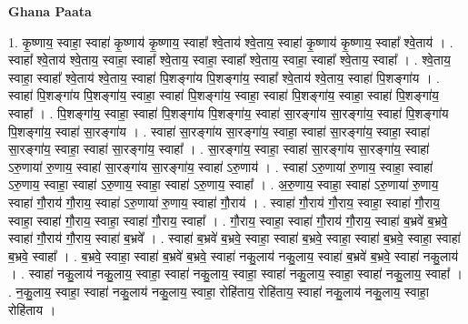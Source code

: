 \documentclass[17pt]{extarticle}
\begin{document}
\textbf{Ghana Paata } \newline

1. कृ॒ष्णाय॒ स्वाहा॒ स्वाहा॑ कृ॒ष्णाय॑ कृ॒ष्णाय॒ स्वाहा᳚ श्वे॒ताय॑ श्वे॒ताय॒ स्वाहा॑ कृ॒ष्णाय॑ कृ॒ष्णाय॒ स्वाहा᳚ श्वे॒ताय॑ । . स्वाहा᳚ श्वे॒ताय॑ श्वे॒ताय॒ स्वाहा॒ स्वाहा᳚ श्वे॒ताय॒ स्वाहा॒ स्वाहा᳚ श्वे॒ताय॒ स्वाहा॒ स्वाहा᳚ श्वे॒ताय॒ स्वाहा᳚ । . श्वे॒ताय॒ स्वाहा॒ स्वाहा᳚ श्वे॒ताय॑ श्वे॒ताय॒ स्वाहा॑ पि॒शङ्गा॑य पि॒शङ्गा॑य॒ स्वाहा᳚ श्वे॒ताय॑ श्वे॒ताय॒ स्वाहा॑ पि॒शङ्गा॑य । . स्वाहा॑ पि॒शङ्गा॑य पि॒शङ्गा॑य॒ स्वाहा॒ स्वाहा॑ पि॒शङ्गा॑य॒ स्वाहा॒ स्वाहा॑ पि॒शङ्गा॑य॒ स्वाहा॒ स्वाहा॑ पि॒शङ्गा॑य॒ स्वाहा᳚ । . पि॒शङ्गा॑य॒ स्वाहा॒ स्वाहा॑ पि॒शङ्गा॑य पि॒शङ्गा॑य॒ स्वाहा॑ सा॒रङ्गा॑य सा॒रङ्गा॑य॒ स्वाहा॑ पि॒शङ्गा॑य पि॒शङ्गा॑य॒ स्वाहा॑ सा॒रङ्गा॑य । . स्वाहा॑ सा॒रङ्गा॑य सा॒रङ्गा॑य॒ स्वाहा॒ स्वाहा॑ सा॒रङ्गा॑य॒ स्वाहा॒ स्वाहा॑ सा॒रङ्गा॑य॒ स्वाहा॒ स्वाहा॑ सा॒रङ्गा॑य॒ स्वाहा᳚ । . सा॒रङ्गा॑य॒ स्वाहा॒ स्वाहा॑ सा॒रङ्गा॑य सा॒रङ्गा॑य॒ स्वाहा॑ ऽरु॒णाया॑ रु॒णाय॒ स्वाहा॑ सा॒रङ्गा॑य सा॒रङ्गा॑य॒ स्वाहा॑ ऽरु॒णाय॑ । . स्वाहा॑ ऽरु॒णाया॑ रु॒णाय॒ स्वाहा॒ स्वाहा॑ ऽरु॒णाय॒ स्वाहा॒ स्वाहा॑ ऽरु॒णाय॒ स्वाहा॒ स्वाहा॑ ऽरु॒णाय॒ स्वाहा᳚ । . अ॒रु॒णाय॒ स्वाहा॒ स्वाहा॑ ऽरु॒णाया॑ रु॒णाय॒ स्वाहा॑ गौ॒राय॑ गौ॒राय॒ स्वाहा॑ ऽरु॒णाया॑ रु॒णाय॒ स्वाहा॑ गौ॒राय॑ । . स्वाहा॑ गौ॒राय॑ गौ॒राय॒ स्वाहा॒ स्वाहा॑ गौ॒राय॒ स्वाहा॒ स्वाहा॑ गौ॒राय॒ स्वाहा॒ स्वाहा॑ गौ॒राय॒ स्वाहा᳚ । . गौ॒राय॒ स्वाहा॒ स्वाहा॑ गौ॒राय॑ गौ॒राय॒ स्वाहा॑ ब॒भ्रवे॑ ब॒भ्रवे॒ स्वाहा॑ गौ॒राय॑ गौ॒राय॒ स्वाहा॑ ब॒भ्रवे᳚ । . स्वाहा॑ ब॒भ्रवे॑ ब॒भ्रवे॒ स्वाहा॒ स्वाहा॑ ब॒भ्रवे॒ स्वाहा॒ स्वाहा॑ ब॒भ्रवे॒ स्वाहा॒ स्वाहा॑ ब॒भ्रवे॒ स्वाहा᳚ । . ब॒भ्रवे॒ स्वाहा॒ स्वाहा॑ ब॒भ्रवे॑ ब॒भ्रवे॒ स्वाहा॑ नकु॒लाय॑ नकु॒लाय॒ स्वाहा॑ ब॒भ्रवे॑ ब॒भ्रवे॒ स्वाहा॑ नकु॒लाय॑ । . स्वाहा॑ नकु॒लाय॑ नकु॒लाय॒ स्वाहा॒ स्वाहा॑ नकु॒लाय॒ स्वाहा॒ स्वाहा॑ नकु॒लाय॒ स्वाहा॒ स्वाहा॑ नकु॒लाय॒ स्वाहा᳚ । . न॒कु॒लाय॒ स्वाहा॒ स्वाहा॑ नकु॒लाय॑ नकु॒लाय॒ स्वाहा॒ रोहि॑ताय॒ रोहि॑ताय॒ स्वाहा॑ नकु॒लाय॑ नकु॒लाय॒ स्वाहा॒ रोहि॑ताय । \newline
\end{document}
